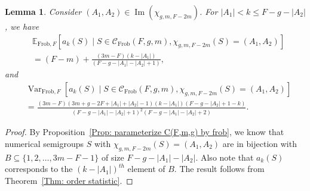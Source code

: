 \documentclass[12pt]{amsart}
\def\E{{\mathbb E}}
\newcommand{\cC}{\mathcal{C}}
\def\Ima{{\operatorname{Im}}}
\def\Var{{\operatorname{Var}}}
\newcommand{\Frob}{\text{Frob}}
\newtheorem{lemma}[theorem]{Lemma}
\begin{document}
\begin{lemma}\label{Lem: aks depth 3 F}
Consider $(A_1,A_2)\in \Ima(\chi_{g,m,F-2m})$. For $|A_1|<k\leq F-g-|A_2|$, we have
\begin{align*}
&\E_{\Frob,F}[a_{k}(S)\mid S\in \cC_{\Frob}(F,g,m), \chi_{g,m,F-2m}(S)=(A_1,A_2)] \\
&= (F-m)+ \frac{(3m-F) (k-|A_1|)}{(F-g-|A_1|-|A_2|+1)},  
\end{align*}
and 
\begin{align*}
&\Var_{\Frob,F}[a_{k}(S)\mid S\in \cC_{\Frob}(F,g,m), \chi_{g,m,F-2m}(S)=(A_1,A_2)] \\
&= \frac{(3m-F)(3m+g-2F+|A_1|+|A_2|-1)(k-|A_1|)(F-g-|A_2|+1-k)}{(F-g-|A_1|-|A_2|+1)^2 (F-g-|A_1|-|A_2|+2)}.  
\end{align*}
\end{lemma}
\begin{proof}
By Proposition~\ref{Prop: parameterize C(F,m,g) by frob}, we know that  numerical semigroups $S$ with $\chi_{g,m,F-2m}(S) = (A_1, A_2)$ are in bijection with $B\subseteq \{1,2,\ldots,3m-F-1\}$ of size $F-g-|A_1|-|A_2|$. Also note that $a_k(S)$ corresponds to the $(k-|A_1|)^{th}$ element of $B$. The result follows from Theorem~\ref{Thm: order statistic}.
\end{proof}
\end{document}
